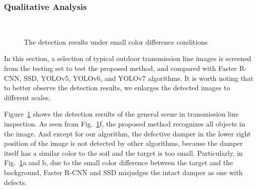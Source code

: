 \documentclass[sn-mathphys,Numbered]{sn-jnl}%
\theoremstyle{thmstyleone}%
\theoremstyle{thmstyletwo}%
\theoremstyle{thmstylethree}%
\begin{document}
\subsubsection {Qualitative Analysis}

\begin{figure}[htbp]
	\centering
 \\
	
	\centering
	\caption{The detection results under small color difference conditions}\label{fig11}
\end{figure}

In this section, a selection of typical outdoor transmission line images is screened from the testing set to test the proposed method, and compared with Faster R-CNN, SSD, YOLOv5, YOLOv6, and YOLOv7 algorithms. It is worth noting that to better observe the detection results, we enlarges the detected images to different scales. 

Figure~\ref{fig11} shows the detection results of the general scene in transmission line inspection. As seen from Fig.~\ref{fig11}f, the proposed method recognizes all objects in the image. And except for our algorithm, the defective damper in the lower right position of the image is not detected by other algorithms, because the damper itself has a similar color to the soil and the target is too small.   Particularly, in Fig.~\ref{fig11}a and b, due to the small color difference between the target and the background, Faster R-CNN and SSD misjudges the intact damper as one with defects.
\end{document}
